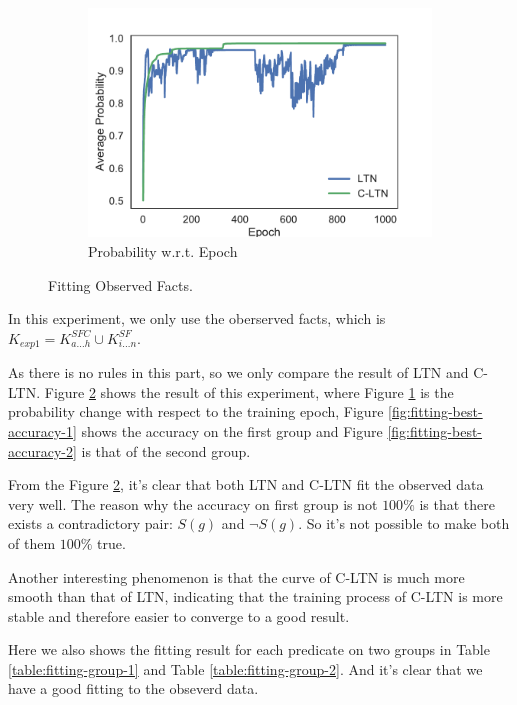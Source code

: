 \begin{figure}[!]
    \begin{subfigure}[]{0.24\textwidth}
        \includegraphics[width=\textwidth]{img/curve1.pdf}
        \caption{Probability w.r.t. Epoch}
        \label{fig:fitting-prob-epoch}
    \end{subfigure}
    \caption{Fitting Observed Facts.}
    \label{fig:fitting}
\end{figure}

In this experiment, we only use the oberserved facts, which is $K_{exp1} = K^{SFC}_{a \dots h} \cup K^{SF}_{i\dots n}$.

As there is no rules in this part, so we only compare the result of LTN and C-LTN.
Figure \ref{fig:fitting} shows the result of this experiment, where Figure \ref{fig:fitting-prob-epoch} is the probability change with respect to the training epoch, Figure \ref{fig:fitting-best-accuracy-1} shows the accuracy on the first group and Figure \ref{fig:fitting-best-accuracy-2} is that of the second group.

From the Figure \ref{fig:fitting}, it's clear that both LTN and C-LTN fit the observed data very well. The reason why the accuracy on first group is not $100\%$ is that there exists a contradictory pair: $S(g)$ and $\neg S(g)$. So it's not possible to make both of them $100\%$ true.

Another interesting phenomenon is that the curve of C-LTN is much more smooth than that of LTN, indicating that the training process of C-LTN is more stable and therefore easier to converge to a good result.

Here we also shows the fitting result for each predicate on two groups in Table \ref{table:fitting-group-1} and Table \ref{table:fitting-group-2}. And it's clear that we have a good fitting to the obseverd data.

